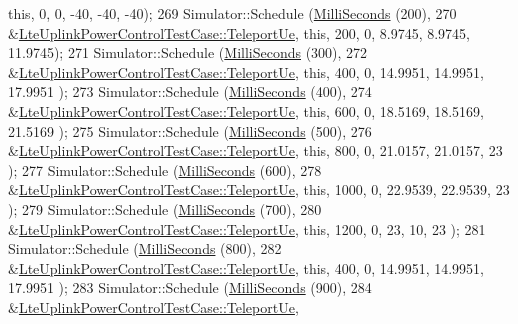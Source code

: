 \begin{DoxyCode}
       \textcolor{keyword}{this}, 0, 0, -40, -40, -40);
269   Simulator::Schedule (\hyperlink{group__timecivil_gaf26127cf4571146b83a92ee18679c7a9}{MilliSeconds} (200),
270                        &\hyperlink{classLteUplinkPowerControlTestCase_a97a59d65135bb418dd2aaabd673c5da0}{LteUplinkPowerControlTestCase::TeleportUe},
       \textcolor{keyword}{this}, 200, 0, 8.9745, 8.9745, 11.9745);
271   Simulator::Schedule (\hyperlink{group__timecivil_gaf26127cf4571146b83a92ee18679c7a9}{MilliSeconds} (300),
272                        &\hyperlink{classLteUplinkPowerControlTestCase_a97a59d65135bb418dd2aaabd673c5da0}{LteUplinkPowerControlTestCase::TeleportUe},
       \textcolor{keyword}{this}, 400, 0, 14.9951, 14.9951, 17.9951 );
273   Simulator::Schedule (\hyperlink{group__timecivil_gaf26127cf4571146b83a92ee18679c7a9}{MilliSeconds} (400),
274                        &\hyperlink{classLteUplinkPowerControlTestCase_a97a59d65135bb418dd2aaabd673c5da0}{LteUplinkPowerControlTestCase::TeleportUe},
       \textcolor{keyword}{this}, 600, 0, 18.5169, 18.5169, 21.5169 );
275   Simulator::Schedule (\hyperlink{group__timecivil_gaf26127cf4571146b83a92ee18679c7a9}{MilliSeconds} (500),
276                        &\hyperlink{classLteUplinkPowerControlTestCase_a97a59d65135bb418dd2aaabd673c5da0}{LteUplinkPowerControlTestCase::TeleportUe},
       \textcolor{keyword}{this}, 800, 0, 21.0157, 21.0157, 23 );
277   Simulator::Schedule (\hyperlink{group__timecivil_gaf26127cf4571146b83a92ee18679c7a9}{MilliSeconds} (600),
278                        &\hyperlink{classLteUplinkPowerControlTestCase_a97a59d65135bb418dd2aaabd673c5da0}{LteUplinkPowerControlTestCase::TeleportUe},
       \textcolor{keyword}{this}, 1000, 0, 22.9539, 22.9539, 23 );
279   Simulator::Schedule (\hyperlink{group__timecivil_gaf26127cf4571146b83a92ee18679c7a9}{MilliSeconds} (700),
280                        &\hyperlink{classLteUplinkPowerControlTestCase_a97a59d65135bb418dd2aaabd673c5da0}{LteUplinkPowerControlTestCase::TeleportUe},
       \textcolor{keyword}{this}, 1200, 0, 23, 10, 23 );
281   Simulator::Schedule (\hyperlink{group__timecivil_gaf26127cf4571146b83a92ee18679c7a9}{MilliSeconds} (800),
282                        &\hyperlink{classLteUplinkPowerControlTestCase_a97a59d65135bb418dd2aaabd673c5da0}{LteUplinkPowerControlTestCase::TeleportUe},
       \textcolor{keyword}{this}, 400, 0, 14.9951, 14.9951, 17.9951 );
283   Simulator::Schedule (\hyperlink{group__timecivil_gaf26127cf4571146b83a92ee18679c7a9}{MilliSeconds} (900),
284                        &\hyperlink{classLteUplinkPowerControlTestCase_a97a59d65135bb418dd2aaabd673c5da0}{LteUplinkPowerControlTestCase::TeleportUe},

\end{DoxyCode}
